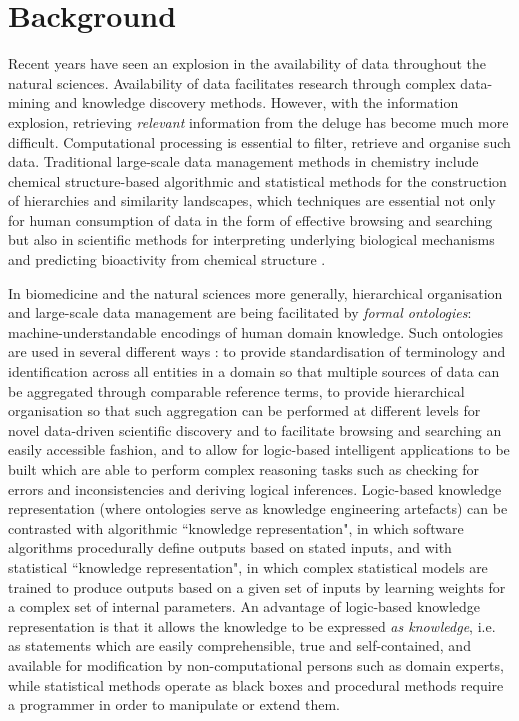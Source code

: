 \documentclass[10pt]{bmc_article}
\newenvironment{bmcformat}{\baselineskip20pt\sloppy\setboolean{publ}{false}}{\baselineskip20pt\sloppy}
\begin{document}
\begin{bmcformat}
\section*{Background}

Recent years have seen an explosion in the availability of data throughout the natural sciences. Availability of data facilitates research through complex data-mining and knowledge discovery methods. However, with the information explosion, retrieving \textit{relevant} information from the deluge has become much more difficult. Computational processing is essential to filter, retrieve and organise such data. Traditional large-scale data management methods in chemistry include chemical structure-based algorithmic and statistical methods for the construction of hierarchies and similarity landscapes, which techniques are essential not only for human consumption of data in the form of effective browsing and searching but also in scientific methods for interpreting underlying biological mechanisms and predicting bioactivity from chemical structure \cite{cacm2011}. 

In biomedicine and the natural sciences more generally, hierarchical organisation and large-scale data management are being facilitated by \textit{formal ontologies}: machine-understandable encodings of human domain knowledge. Such ontologies are used in several different ways \cite{lambrix2004,courtotsysbio2011,Harland2011940}: to provide standardisation of terminology and identification across all entities in a domain so that multiple sources of data can be aggregated through comparable reference terms, to provide hierarchical organisation so that such aggregation can be performed at different levels for novel data-driven scientific discovery and to facilitate browsing and searching an easily accessible fashion, and to allow for logic-based intelligent applications to be built which are able to perform complex reasoning tasks such as checking for errors and inconsistencies and deriving logical inferences. Logic-based knowledge representation (where ontologies serve as knowledge engineering artefacts) can be contrasted with algorithmic ``knowledge representation", in which software algorithms procedurally define outputs based on stated inputs, and with statistical ``knowledge representation", in which complex statistical models are trained to produce outputs based on a given set of inputs by learning weights for a complex set of internal parameters.  An advantage of logic-based knowledge representation is that it allows the knowledge to be expressed \textit{as knowledge}, i.e. as statements which are easily comprehensible, true and self-contained, and available for modification by non-computational persons such as domain experts, while statistical methods operate as black boxes and procedural methods require a programmer in order to manipulate or extend them. 


\end{bmcformat}
\end{document}
